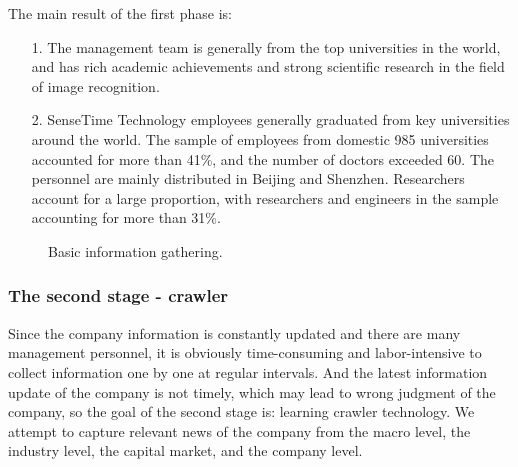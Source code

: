 \documentclass{article}
\begin{document}
The main result of the first phase is:
\begin{itemize}
	\item[1.] The management team is generally from the top universities in the world, and has rich academic achievements and strong scientific research in the field of image recognition.
	\item[2.] SenseTime Technology employees generally graduated from key universities around the world. The sample of employees from domestic 985 universities accounted for more than 41\%, and the number of doctors exceeded 60. The personnel are mainly distributed in Beijing and Shenzhen. Researchers account for a large proportion, with researchers and engineers in the sample accounting for more than 31\%.
\end{itemize}
\begin{figure}[htb]
	\centering
	\caption{Basic information gathering.}
\end{figure}

\subsubsection{The second stage - crawler}
Since the company information is constantly updated and there are many management personnel, it is obviously time-consuming and labor-intensive to collect information one by one at regular intervals.
And the latest information update of the company is not timely, which may lead to wrong judgment of the company, so the goal of the second stage is: learning crawler technology.
We attempt to capture relevant news of the company from the macro level, the industry level, the capital market, and the company level.
\end{document}
